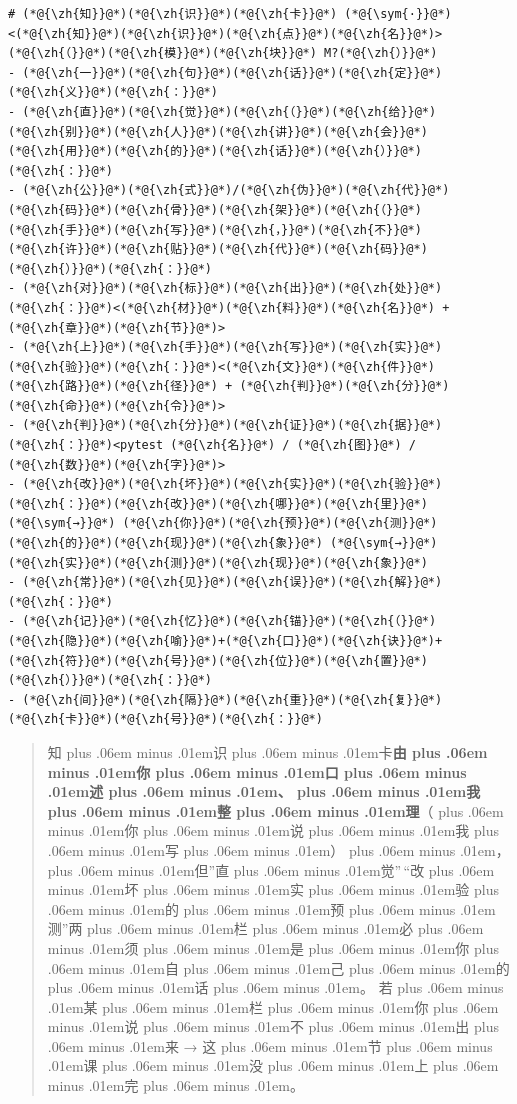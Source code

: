 \documentclass[
]{article}
\def\zh#1{{\zhfont #1}}
\def\sym#1{{\symfont #1}}
\def\zhglue{\hskip0pt plus .06em minus .01em}
\begin{document}
\begin{lstlisting}
# (*@{\zh{知}}@*)(*@{\zh{识}}@*)(*@{\zh{卡}}@*) (*@{\sym{·}}@*) <(*@{\zh{知}}@*)(*@{\zh{识}}@*)(*@{\zh{点}}@*)(*@{\zh{名}}@*)>(*@{\zh{（}}@*)(*@{\zh{模}}@*)(*@{\zh{块}}@*) M?(*@{\zh{）}}@*)
- (*@{\zh{一}}@*)(*@{\zh{句}}@*)(*@{\zh{话}}@*)(*@{\zh{定}}@*)(*@{\zh{义}}@*)(*@{\zh{：}}@*)
- (*@{\zh{直}}@*)(*@{\zh{觉}}@*)(*@{\zh{（}}@*)(*@{\zh{给}}@*)(*@{\zh{别}}@*)(*@{\zh{人}}@*)(*@{\zh{讲}}@*)(*@{\zh{会}}@*)(*@{\zh{用}}@*)(*@{\zh{的}}@*)(*@{\zh{话}}@*)(*@{\zh{）}}@*)(*@{\zh{：}}@*)
- (*@{\zh{公}}@*)(*@{\zh{式}}@*)/(*@{\zh{伪}}@*)(*@{\zh{代}}@*)(*@{\zh{码}}@*)(*@{\zh{骨}}@*)(*@{\zh{架}}@*)(*@{\zh{（}}@*)(*@{\zh{手}}@*)(*@{\zh{写}}@*)(*@{\zh{，}}@*)(*@{\zh{不}}@*)(*@{\zh{许}}@*)(*@{\zh{贴}}@*)(*@{\zh{代}}@*)(*@{\zh{码}}@*)(*@{\zh{）}}@*)(*@{\zh{：}}@*)
- (*@{\zh{对}}@*)(*@{\zh{标}}@*)(*@{\zh{出}}@*)(*@{\zh{处}}@*)(*@{\zh{：}}@*)<(*@{\zh{材}}@*)(*@{\zh{料}}@*)(*@{\zh{名}}@*) + (*@{\zh{章}}@*)(*@{\zh{节}}@*)>
- (*@{\zh{上}}@*)(*@{\zh{手}}@*)(*@{\zh{写}}@*)(*@{\zh{实}}@*)(*@{\zh{验}}@*)(*@{\zh{：}}@*)<(*@{\zh{文}}@*)(*@{\zh{件}}@*)(*@{\zh{路}}@*)(*@{\zh{径}}@*) + (*@{\zh{判}}@*)(*@{\zh{分}}@*)(*@{\zh{命}}@*)(*@{\zh{令}}@*)>
- (*@{\zh{判}}@*)(*@{\zh{分}}@*)(*@{\zh{证}}@*)(*@{\zh{据}}@*)(*@{\zh{：}}@*)<pytest (*@{\zh{名}}@*) / (*@{\zh{图}}@*) / (*@{\zh{数}}@*)(*@{\zh{字}}@*)>
- (*@{\zh{改}}@*)(*@{\zh{坏}}@*)(*@{\zh{实}}@*)(*@{\zh{验}}@*)(*@{\zh{：}}@*)(*@{\zh{改}}@*)(*@{\zh{哪}}@*)(*@{\zh{里}}@*) (*@{\sym{→}}@*) (*@{\zh{你}}@*)(*@{\zh{预}}@*)(*@{\zh{测}}@*)(*@{\zh{的}}@*)(*@{\zh{现}}@*)(*@{\zh{象}}@*) (*@{\sym{→}}@*) (*@{\zh{实}}@*)(*@{\zh{测}}@*)(*@{\zh{现}}@*)(*@{\zh{象}}@*)
- (*@{\zh{常}}@*)(*@{\zh{见}}@*)(*@{\zh{误}}@*)(*@{\zh{解}}@*)(*@{\zh{：}}@*)
- (*@{\zh{记}}@*)(*@{\zh{忆}}@*)(*@{\zh{锚}}@*)(*@{\zh{（}}@*)(*@{\zh{隐}}@*)(*@{\zh{喻}}@*)+(*@{\zh{口}}@*)(*@{\zh{诀}}@*)+(*@{\zh{符}}@*)(*@{\zh{号}}@*)(*@{\zh{位}}@*)(*@{\zh{置}}@*)(*@{\zh{）}}@*)(*@{\zh{：}}@*)
- (*@{\zh{间}}@*)(*@{\zh{隔}}@*)(*@{\zh{重}}@*)(*@{\zh{复}}@*)(*@{\zh{卡}}@*)(*@{\zh{号}}@*)(*@{\zh{：}}@*)
\end{lstlisting}

\begin{quote}
\zh{知\zhglue 识\zhglue 卡}\textbf{\zh{由\zhglue 你\zhglue 口\zhglue 述\zhglue 、\zhglue 我\zhglue 整\zhglue 理}}\zh{（\zhglue 你\zhglue 说\zhglue 我\zhglue 写\zhglue ）\zhglue ，\zhglue 但}''\zh{直\zhglue 觉}''\,``\zh{改\zhglue 坏\zhglue 实\zhglue 验\zhglue 的\zhglue 预\zhglue 测}''\zh{两\zhglue 栏\zhglue 必\zhglue 须\zhglue 是\zhglue 你\zhglue 自\zhglue 己\zhglue 的\zhglue 话\zhglue 。} \zh{若\zhglue 某\zhglue 栏\zhglue 你\zhglue 说\zhglue 不\zhglue 出\zhglue 来} \sym{→} \zh{这\zhglue 节\zhglue 课\zhglue 没\zhglue 上\zhglue 完\zhglue 。}
\end{quote}
\end{document}

